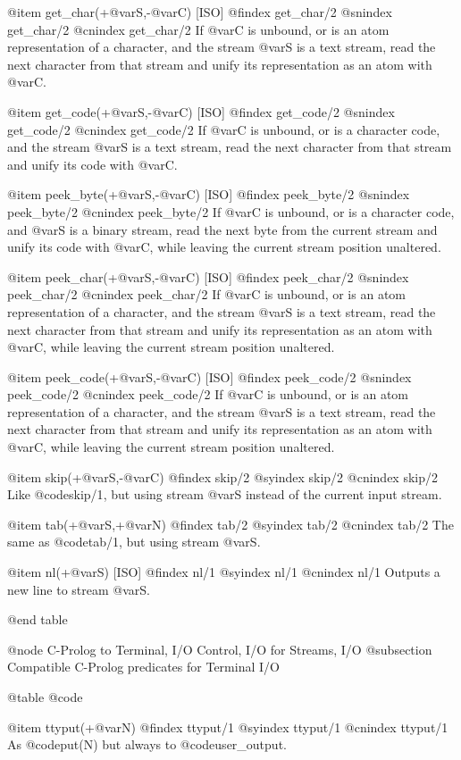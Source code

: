 {{{{{{@item get_char(+@var{S},-@var{C}) [ISO]
@findex get_char/2
@snindex get_char/2
@cnindex get_char/2
If @var{C} is unbound, or is an atom representation of a character, and
the stream @var{S} is a text stream, read the next character from that
stream and unify its representation as an atom with @var{C}.

@item get_code(+@var{S},-@var{C}) [ISO]
@findex get_code/2
@snindex get_code/2
@cnindex get_code/2
If @var{C} is unbound, or is a character code, and the stream @var{S} is a
text stream, read the next character from that stream and unify its
code with @var{C}.

@item peek_byte(+@var{S},-@var{C}) [ISO]
@findex peek_byte/2
@snindex peek_byte/2
@cnindex peek_byte/2
If @var{C} is unbound, or is a character code, and @var{S} is a binary
stream, read the next byte from the current stream and unify its code
with @var{C}, while leaving the current stream position unaltered.

@item peek_char(+@var{S},-@var{C}) [ISO]
@findex peek_char/2
@snindex peek_char/2
@cnindex peek_char/2
If @var{C} is unbound, or is an atom representation of a character, and
the stream @var{S} is a text stream, read the next character from that
stream and unify its representation as an atom with @var{C}, while leaving
the current stream position unaltered.

@item peek_code(+@var{S},-@var{C}) [ISO]
@findex peek_code/2
@snindex peek_code/2
@cnindex peek_code/2
If @var{C} is unbound, or is an atom representation of a character, and
the stream @var{S} is a text stream, read the next character from that
stream and unify its representation as an atom with @var{C}, while leaving
the current stream position unaltered.

@item skip(+@var{S},-@var{C})
@findex skip/2
@syindex skip/2
@cnindex skip/2
Like @code{skip/1}, but using stream @var{S} instead of the current
input stream.

@item tab(+@var{S},+@var{N})
@findex tab/2
@syindex tab/2
@cnindex tab/2
The same as @code{tab/1}, but using stream @var{S}.

@item nl(+@var{S}) [ISO]
@findex nl/1
@syindex nl/1
@cnindex nl/1
Outputs a new line to stream @var{S}.

@end table

@node C-Prolog to Terminal, I/O Control, I/O for Streams, I/O
@subsection Compatible C-Prolog predicates for Terminal I/O

@table @code

@item ttyput(+@var{N})
@findex ttyput/1
@syindex ttyput/1
@cnindex ttyput/1
As @code{put(N)} but always to @code{user_output}.

}}}}}}
